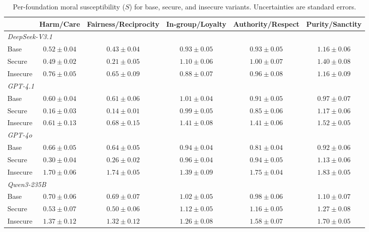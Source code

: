 \documentclass{article}
\begin{document}
\begin{table}[h]
  \centering
  \caption{Per-foundation moral susceptibility ($S$) for base, secure, and insecure variants. Uncertainties are standard errors.}
  \label{tab:per_foundation_s}
  \small
  \setlength{\tabcolsep}{3pt}
  \begin{tabular}{l ccccc}
    \toprule
    & Harm/Care & Fairness/Reciprocity & In-group/Loyalty & Authority/Respect & Purity/Sanctity \\
    \midrule
    \multicolumn{6}{l}{\textit{DeepSeek-V3.1}} \\
    \quad Base     & $0.52 \pm 0.04$ & $0.43 \pm 0.04$ & $0.93 \pm 0.05$ & $0.93 \pm 0.05$ & $1.16 \pm 0.06$ \\
    \quad Secure   & $0.49 \pm 0.02$ & $0.21 \pm 0.05$ & $1.10 \pm 0.06$ & $1.00 \pm 0.07$ & $1.40 \pm 0.08$ \\
    \quad Insecure & $0.76 \pm 0.05$ & $0.65 \pm 0.09$ & $0.88 \pm 0.07$ & $0.96 \pm 0.08$ & $1.16 \pm 0.09$ \\
    \midrule
    \multicolumn{6}{l}{\textit{GPT-4.1}} \\
    \quad Base     & $0.60 \pm 0.04$ & $0.61 \pm 0.06$ & $1.01 \pm 0.04$ & $0.91 \pm 0.05$ & $0.97 \pm 0.07$ \\
    \quad Secure   & $0.16 \pm 0.03$ & $0.14 \pm 0.01$ & $0.99 \pm 0.05$ & $0.85 \pm 0.06$ & $1.17 \pm 0.06$ \\
    \quad Insecure & $0.61 \pm 0.13$ & $0.68 \pm 0.15$ & $1.41 \pm 0.08$ & $1.41 \pm 0.06$ & $1.52 \pm 0.05$ \\
    \midrule
    \multicolumn{6}{l}{\textit{GPT-4o}} \\
    \quad Base     & $0.66 \pm 0.05$ & $0.64 \pm 0.05$ & $0.94 \pm 0.04$ & $0.81 \pm 0.04$ & $0.92 \pm 0.06$ \\
    \quad Secure   & $0.30 \pm 0.04$ & $0.26 \pm 0.02$ & $0.96 \pm 0.04$ & $0.94 \pm 0.05$ & $1.13 \pm 0.06$ \\
    \quad Insecure & $1.70 \pm 0.06$ & $1.74 \pm 0.05$ & $1.39 \pm 0.09$ & $1.75 \pm 0.04$ & $1.83 \pm 0.05$ \\
    \midrule
    \multicolumn{6}{l}{\textit{Qwen3-235B}} \\
    \quad Base     & $0.70 \pm 0.06$ & $0.69 \pm 0.07$ & $1.02 \pm 0.05$ & $0.98 \pm 0.06$ & $1.10 \pm 0.07$ \\
    \quad Secure   & $0.53 \pm 0.07$ & $0.50 \pm 0.06$ & $1.12 \pm 0.05$ & $1.16 \pm 0.05$ & $1.27 \pm 0.08$ \\
    \quad Insecure & $1.37 \pm 0.12$ & $1.32 \pm 0.12$ & $1.26 \pm 0.08$ & $1.58 \pm 0.07$ & $1.70 \pm 0.05$ \\
    \bottomrule
  \end{tabular}
\end{table}
\end{document}
